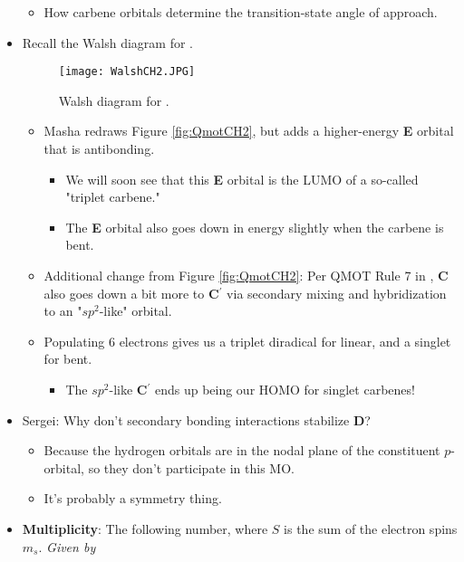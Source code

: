\documentclass[../notes.tex]{subfiles}
\begin{document}
\begin{itemize}
\begin{itemize}
        \item How carbene orbitals determine the transition-state angle of approach.
    \end{itemize}
    \item Recall the Walsh diagram for .
    \begin{figure}[h!]
        \centering
        \texttt{[image: WalshCH2.JPG]}
        \caption{Walsh diagram for .}
        \label{fig:WalshCH2}
    \end{figure}
    \begin{itemize}
        \item Masha redraws Figure \ref{fig:QmotCH2}, but adds a higher-energy \textbf{E} orbital that is antibonding.
        \begin{itemize}
            \item We will soon see that this \textbf{E} orbital is the LUMO of a so-called "triplet carbene."
            \item The \textbf{E} orbital also goes down in energy slightly when the carbene is bent.
        \end{itemize}
        \item Additional change from Figure \ref{fig:QmotCH2}: Per QMOT Rule 7 in \textcite{bib:Anslyn}, \textbf{C} also goes down a bit more to \textbf{C${}^{\bm{\prime}}$} via secondary mixing and hybridization to an "$sp^2$-like" orbital.
        \item Populating 6 electrons gives us a triplet diradical for linear, and a singlet for bent.
        \begin{itemize}
            \item The $sp^2$-like \textbf{C${}^{\bm{\prime}}$} ends up being our HOMO for singlet carbenes!
        \end{itemize}
    \end{itemize}
    \item Sergei: Why don't secondary bonding interactions stabilize \textbf{D}?
    \begin{itemize}
        \item Because the hydrogen orbitals are in the nodal plane of the constituent $p$-orbital, so they don't participate in this MO.
        \item It's probably a symmetry thing.
    \end{itemize}
    \item \textbf{Multiplicity}: The following number, where $S$ is the sum of the electron spins $m_s$. \emph{Given by}

\end{itemize}
\end{document}
